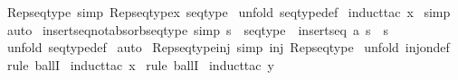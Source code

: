 \begin{isabellebody}
\ Rep{\isacharunderscore}seqtype\ {\isacharbrackleft}simp{\isacharbrackright}{\isacharcolon}\ {\isachardoublequoteopen}Rep{\isacharunderscore}seqtype{\isacharparenleft}x{\isacharparenright}{\isacharcolon}\ seqtype{\isachardoublequoteclose}\isanewline
%
\isadelimproof
%
\endisadelimproof
%
\isatagproof
{}\isamarkupfalse%
\ {\isacharparenleft}unfold\ seqtype{\isacharunderscore}def{\isacharparenright}\isanewline
{}\isamarkupfalse%
\ {\isacharparenleft}induct{\isacharunderscore}tac\ {\isachardoublequoteopen}x{\isachardoublequoteclose}{\isacharparenright}\isanewline
{}\isamarkupfalse%
\ {\isacharparenleft}simp{\isacharparenright}\isanewline
{}\isamarkupfalse%
\ auto\isanewline
{}\isamarkupfalse%
%
\endisatagproof
{\isafoldproof}%
%
\isadelimproof
\isanewline
%
\endisadelimproof
\isanewline
{}\isamarkupfalse%
\ insertseq{\isacharunderscore}not{\isacharunderscore}absorb{\isacharunderscore}seqtype\ {\isacharbrackleft}simp{\isacharbrackright}{\isacharcolon}\ {\isachardoublequoteopen}s\ {\isacharcolon}\ seqtype\ {\isacharequal}{\isacharequal}{\isachargreater}\ {\isacharparenleft}insertseq\ a\ s\ {\isachartilde}{\isacharequal}\ s{\isacharparenright}{\isachardoublequoteclose}\isanewline
%
\isadelimproof
%
\endisadelimproof
%
\isatagproof
{}\isamarkupfalse%
\ {\isacharparenleft}unfold\ seqtype{\isacharunderscore}def{\isacharparenright}\isanewline
{}\isamarkupfalse%
\ auto\isanewline
{}\isamarkupfalse%
%
\endisatagproof
{\isafoldproof}%
%
\isadelimproof
\isanewline
%
\endisadelimproof
\isanewline
{}\isamarkupfalse%
\ Rep{\isacharunderscore}seqtype{\isacharunderscore}inj\ {\isacharbrackleft}simp{\isacharbrackright}{\isacharcolon}\ {\isachardoublequoteopen}inj\ Rep{\isacharunderscore}seqtype{\isachardoublequoteclose}\isanewline
%
\isadelimproof
%
\endisadelimproof
%
\isatagproof
{}\isamarkupfalse%
\ {\isacharparenleft}unfold\ inj{\isacharunderscore}on{\isacharunderscore}def{\isacharparenright}\isanewline
{}\isamarkupfalse%
\ {\isacharparenleft}rule\ ballI{\isacharparenright}\isanewline
{}\isamarkupfalse%
\ {\isacharparenleft}induct{\isacharunderscore}tac\ {\isachardoublequoteopen}x{\isachardoublequoteclose}{\isacharparenright}\isanewline
{}\isamarkupfalse%
\ {\isacharparenleft}rule\ ballI{\isacharparenright}\isanewline
{}\isamarkupfalse%
\ {\isacharparenleft}induct{\isacharunderscore}tac\ {\isachardoublequoteopen}y{\isachardoublequoteclose}{\isacharparenright}\isanewline

\end{isabellebody}
